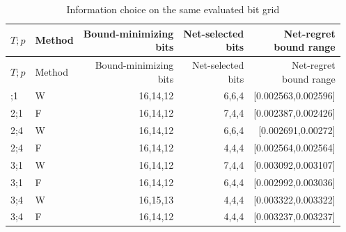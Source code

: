 {\small
\setlength{\tabcolsep}{3.5pt}
\begin{longtable}{@{}llrrr@{}}
\caption{Information choice on the same evaluated bit grid}\label{tab:sensor49}\\
\toprule
$T;p$ & Method & \shortstack{Bound-minimizing\\bits} & \shortstack{Net-selected\\bits} & \shortstack{Net-regret\\bound range} \\
\midrule
\endfirsthead
\toprule
$T;p$ & Method & \shortstack{Bound-minimizing\\bits} & \shortstack{Net-selected\\bits} & \shortstack{Net-regret\\bound range} \\
\midrule
\endhead
\bottomrule
\endfoot
2;1 & W & 16,14,12 & 6,6,4 & [0.002563,0.002596] \\
2;1 & F & 16,14,12 & 7,4,4 & [0.002387,0.002426] \\
2;4 & W & 16,14,12 & 6,6,4 & [0.002691,0.00272] \\
2;4 & F & 16,14,12 & 4,4,4 & [0.002564,0.002564] \\
3;1 & W & 16,14,12 & 7,4,4 & [0.003092,0.003107] \\
3;1 & F & 16,14,12 & 6,4,4 & [0.002992,0.003036] \\
3;4 & W & 16,15,13 & 4,4,4 & [0.003322,0.003322] \\
3;4 & F & 16,14,12 & 4,4,4 & [0.003237,0.003237] \\
\end{longtable}
}
